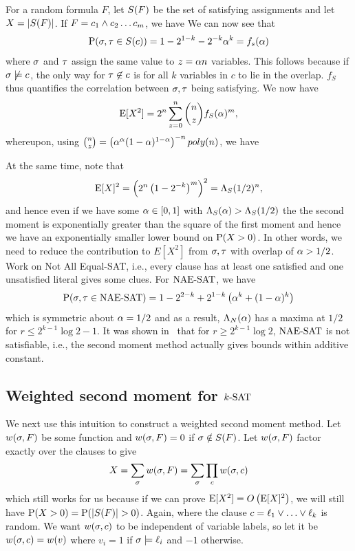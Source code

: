 \documentclass[letterpaper, 10pt, twocolumn, reqno]{amsart}
\begin{document}
For a random formula $F$, let $\sf$ be the set of satisfying assignments and let $X = \abs{\sf}$. If $F = c_1 \aand c_2 \ldots c_m$, we have
We can now see that
$$
\P(\s,\t \in \sc) = 1 -2^{1-k} - 2^{-k}\a^k = f_s(\a)
$$
where $\s$ and $\t$ assign the same value to $z = \a n$ variables. This follows because if $\s \not\sat c$, the only way for $\t \not\in c$ is for all $k$ variables in $c$ to lie in the overlap. $f_S$ thus quantifies the correlation between $\s,\t$ being satisfying. We now have
$$
\E[X^2] = 2^n \sum_{z=0}^n {n \choose z} f_S(\a)^m,
$$
whereupon, using ${n \choose z} = \rbrac{\a^\a (1-\a)^{1-\a}}^{-n} poly(n)$, we have

At the same time, note that
$$
\E[X]^2 = \rbrac{2^n \rbrac{1 - 2^{-k}}^m }^2 = \L_S(1/2)^n,
$$
and hence even if we have some $\a \in [0,1]$ with $\L_S(\a) > \L_S(1/2)$ the
the second moment is exponentially greater than the square of the first moment and hence we have an exponentially smaller lower bound on $\P(X > 0)$. In
other words, we need to reduce the contribution to $E[X^2]$ from $\s,\t$ with overlap of $\a > 1/2$. Work on Not All Equal-SAT, i.e., every clause has at
least one satisfied and one unsatisfied literal gives some clues. For $\NAESAT$, we have
$$
\P(\s,\t \in \NAESAT) = 1 - 2^{2-k} + 2^{1-k} \rbrac{\a^k + (1-\a)^k}
$$
which is symmetric about $\a = 1/2$ and as a result, $\L_N(\a)$ has a maxima at $1/2$ for $r \leq 2^{k-1} \log2 -1$. It was shown in~\cite{achlioptas2002asymptotic} that for $r \geq 2^{k-1} \log2$, $\NAESAT$ is not satisfiable, i.e., the second moment method actually gives bounds within additive constant.

\subsection{Weighted second moment for $\ksat$}
\label{ssec:ksat_weighted}
We next use this intuition to construct a weighted second moment method. Let $\wsf$ be some function and $\wsf = 0$ if $\s \notin \sf$. Let $\wsf$ factor exactly over the clauses to give
$$X = \sum_\s \wsf = \sum_\s \prod_c \wsc$$
which still works for us because if we can prove $\E[X^2] = \bigo\rbrac{\E[X]^2}$, we will still have $\P(X > 0) = \P(\abs{\sf} > 0)$. Again,
where the clause $c = \ell_1 \oor \ldots \oor \ell_k$ is random. We want $\wsc$ to be independent of variable labels, so let it be $\wsc = \wv$ where $v_i =1$ if $\s \sat \ell_i$ and $-1$ otherwise.
\end{document}
